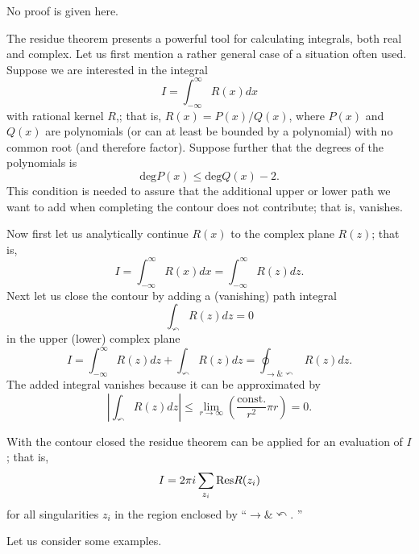  No proof is given here.

The residue theorem presents a powerful tool for calculating integrals, both real and complex.
Let us first mention a rather general case of a situation often used.
Suppose we are interested in the integral
  $$I=\int_{-\infty}^{\infty} R(x) dx$$
with rational kernel $R$,; that is, $R(x)= P(x)/Q(x)$,
where $P(x)$ and $Q(x)$
are polynomials (or can at least be bounded by a polynomial) with no common root (and therefore factor).
Suppose further that the degrees of the polynomials is
$$
\textrm{deg} P(x) \le
\textrm{deg} Q(x) -2.
$$
This condition is needed to assure that the additional upper or lower path we want to add when completing the contour
does not contribute; that is, vanishes.

Now first let us analytically continue $R(x)$ to the complex plane $R(z)$; that is,
$$I=\int_{-\infty}^{\infty} R(x) dx =\int_{-\infty}^{\infty} R(z) dz.$$
Next let us close the contour by adding a (vanishing) path integral
$$\int_{\curvearrowleft} R(z) dz =
0$$
in the upper (lower) complex plane
$$I=\int_{-\infty}^{\infty} R(z) dz +\int_{\curvearrowleft} R(z) dz=\oint_{\rightarrow \& \curvearrowleft} R(z) dz.$$
The added integral vanishes because
it can be approximated by
$$\left| \int_{\curvearrowleft} R(z)  dz\right| \le \lim_{r\rightarrow \infty} \left(\frac{\textrm{const.}}{r^2} \pi r \right) =0.$$

With the contour closed the residue theorem can be applied  for an evaluation of $I$; that is,
$$I= 2\pi i \sum_{z_i} {\rm Res}R(z_i)$$
for all singularities $z_i$ in the region enclosed by ``$\rightarrow \& \curvearrowleft$. ''

Let us consider some examples.

